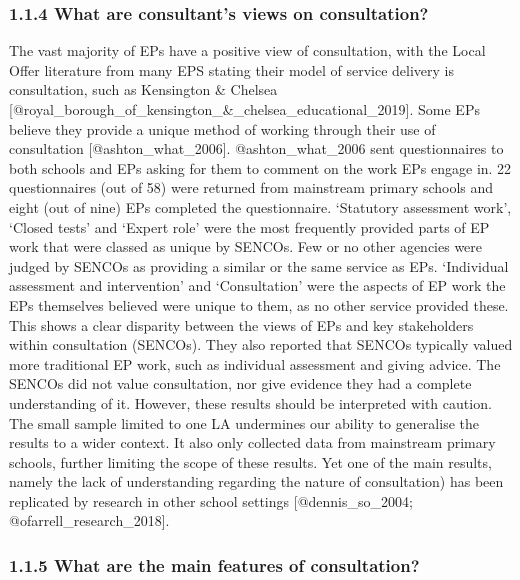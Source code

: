 \documentclass[
]{article}
\begin{document}
\hypertarget{what-are-consultants-views-on-consultation}{%
\subsubsection{1.1.4 What are consultant's views on
consultation?}\label{what-are-consultants-views-on-consultation}}

The vast majority of EPs have a positive view of consultation, with the
Local Offer literature from many EPS stating their model of service
delivery is consultation, such as Kensington \& Chelsea
{[}@royal\_borough\_of\_kensington\_\&\_chelsea\_educational\_2019{]}.
Some EPs believe they provide a unique method of working through their
use of consultation {[}@ashton\_what\_2006{]}. @ashton\_what\_2006 sent
questionnaires to both schools and EPs asking for them to comment on the
work EPs engage in. 22 questionnaires (out of 58) were returned from
mainstream primary schools and eight (out of nine) EPs completed the
questionnaire. `Statutory assessment work', `Closed tests' and `Expert
role' were the most frequently provided parts of EP work that were
classed as unique by SENCOs. Few or no other agencies were judged by
SENCOs as providing a similar or the same service as EPs. `Individual
assessment and intervention' and `Consultation' were the aspects of EP
work the EPs themselves believed were unique to them, as no other
service provided these. This shows a clear disparity between the views
of EPs and key stakeholders within consultation (SENCOs). They also
reported that SENCOs typically valued more traditional EP work, such as
individual assessment and giving advice. The SENCOs did not value
consultation, nor give evidence they had a complete understanding of it.
However, these results should be interpreted with caution. The small
sample limited to one LA undermines our ability to generalise the
results to a wider context. It also only collected data from mainstream
primary schools, further limiting the scope of these results. Yet one of
the main results, namely the lack of understanding regarding the nature
of consultation) has been replicated by research in other school
settings {[}@dennis\_so\_2004; @ofarrell\_research\_2018{]}.

\hypertarget{what-are-the-main-features-of-consultation}{%
\subsubsection{1.1.5 What are the main features of
consultation?}\label{what-are-the-main-features-of-consultation}}
\end{document}
